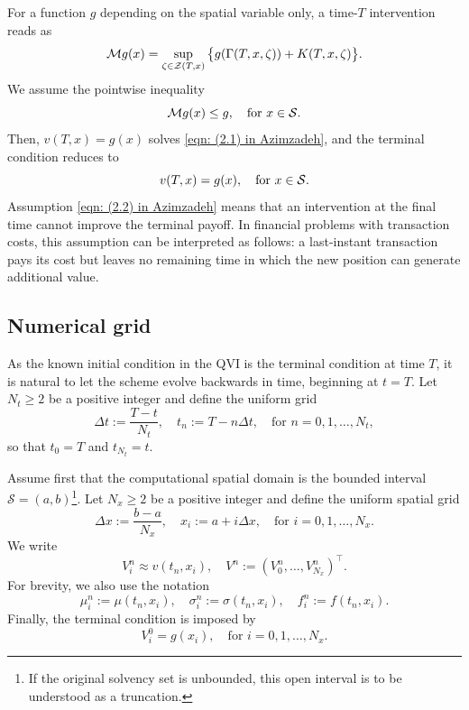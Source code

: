For a function $g$ depending on the spatial variable only, a time-$T$ intervention reads as
\begin{equation*}
    \mathcal{M} g(x) =  \sup_{\zeta \in \mathcal{Z}(T,x)} \big\{ g(\Gamma(T,x,\zeta)) + K(T,x,\zeta) \big\}.
\end{equation*}
We assume the pointwise inequality 
\begin{equation}
    \mathcal{M} g(x) \leq g, \quad \text{for } x\in \mathcal{S}.
    \label{eqn: (2.2) in Azimzadeh}
\end{equation}
Then, $v(T,x) = g(x)$ solves \eqref{eqn: (2.1) in Azimzadeh}, and the terminal condition reduces to
\begin{equation*}
    v(T,x) = g(x), \quad \text{for } x \in \mathcal{S}.
\end{equation*}
Assumption \eqref{eqn: (2.2) in Azimzadeh} means that an intervention at the final time cannot improve the terminal payoff. In financial problems with transaction costs, this assumption can be interpreted as follows: a last-instant transaction pays its cost but leaves no remaining time in which the new position can generate additional value. 

\subsection{Numerical grid}
\label{section: Numerical grid}
As the known initial condition in the QVI is the terminal condition at time $T$, it is natural to let the scheme evolve backwards in time, beginning at $t=T$. Let $N_t \geq 2$ be a positive integer and define the uniform grid
\begin{equation*}
    \Delta t := \frac{T-t}{N_t}, \quad t_n := T - n \Delta t, \quad \text{for } n = 0, 1, \ldots, N_t,
\end{equation*}
so that $t_0=T$ and $t_{N_t}=t$.

Assume first that the computational spatial domain is the bounded interval $\mathcal{S}=(a,b)$\footnote{If the original solvency set is unbounded, this open interval is to be understood as a truncation.}. Let $N_x \geq 2$ be a positive integer and define the uniform spatial grid
\begin{equation*}
    \Delta x := \frac{b-a}{N_x}, \quad x_i := a + i \Delta x, \quad \text{for } i = 0, 1, \ldots, N_x. 
\end{equation*}
We write 
\begin{equation*}
    V_i^n \approx v(t_n,x_i), \quad V^n := (V_0^n, \ldots ,V_{N_x}^n)^\top. 
\end{equation*}
For brevity, we also use the notation 
\begin{equation*}
    \mu_i^n := \mu(t_n,x_i), \quad \sigma_i^n := \sigma(t_n,x_i), \quad f_i^n := f(t_n,x_i).
\end{equation*}
Finally, the terminal condition is imposed by
\begin{equation*}
    V_i^0 = g(x_i), \quad \text{for } i = 0, 1, \ldots, N_x.  
\end{equation*}

